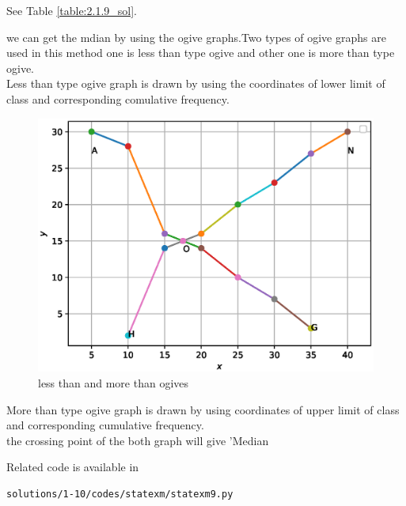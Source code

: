 See Table \ref{table:2.1.9_sol}.

 \begin{table}[!ht]
	\centering
	
	\caption{}
\label{table:2.1.9_sol}
\end{table}
 we can get the mdian by using the ogive graphs.Two types of ogive graphs are used in this method one is less than type ogive and other one is more than type ogive.
\\
 Less than type ogive graph is drawn by using the coordinates of lower limit of class and corresponding comulative frequency.
\\
\begin{figure}[!ht]
	\centering
	\includegraphics[width=\columnwidth]{./solutions/1-10/figures/statexm/statexm9.eps}
	\caption{less than and more than ogives }
	\label{ogive}
\end{figure}
 More than type ogive graph is drawn by using coordinates of upper limit of class and corresponding cumulative frequency.
\\
 the crossing point of the both graph will give 'Median

Related code is available in 
 \begin{lstlisting}
solutions/1-10/codes/statexm/statexm9.py
 \end{lstlisting}
